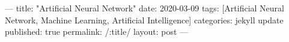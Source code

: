 ---
title: "Artificial Neural Network"
date: 2020-03-09
tags: [Artificial Neural Network, Machine Learning, Artificial Intelligence]
categories: jekyll update
published: true
permalink: /:title/
layout: post
---


